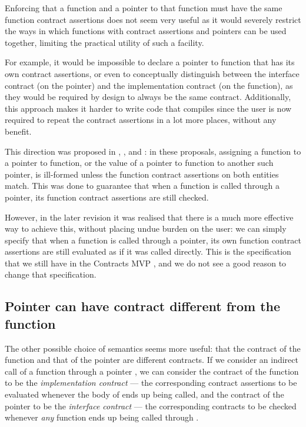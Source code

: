 Enforcing that a function and a pointer to that function must have the same function contract assertions does not seem very useful as it would severely restrict the ways in which functions with contract assertions and pointers can be used together, limiting the practical utility of such a facility.

For example, it would be impossible to declare a pointer to function that has its own contract assertions, or even to conceptually distinguish between the interface contract (on the pointer) and the implementation contract (on the function), as they would be required by design to always be the same contract. Additionally, this approach makes it harder to write code that compiles since the user is now required to repeat the contract assertions in a lot more places, without any benefit.

This direction was proposed in \cite{N4415}, \cite{P0287R0}, and \cite{P0380R0}: in these proposals, assigning a function to a pointer to function, or the value of a pointer to function to another such pointer, is ill-formed unless the function contract assertions on both entities match. This was done to guarantee that when a function is called through a pointer, its function contract assertions are still checked.

However, in the later revision \cite{P0380R1} it was realised that there is a much more effective way to achieve this, without placing undue burden on the user: we can simply specify that when a function is called through a pointer, its own function contract assertions are still evaluated as if it was called directly. This is the specification that we still have in the Contracts MVP \cite{P2900R7}, and we do not see a good reason to change that specification.

\subsection{Pointer can have contract different from the function}

The other possible choice of semantics seems more useful: that the contract of the function and that of the pointer are different contracts. If we consider an indirect call of a function  through a pointer , we can consider the contract of the function  to be the \emph{implementation contract} --- the corresponding contract assertions to be evaluated whenever the body of  ends up being called, and the contract of the pointer  to be the \emph{interface contract} --- the corresponding contracts to be checked whenever \emph{any} function ends up being called through .

